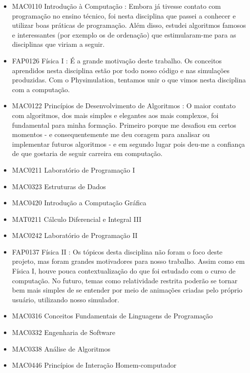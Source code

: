 \begin{itemize}

\item MAC0110   Introdução à Computação : Embora já tivesse contato com programação no ensino técnico, foi nesta disciplina que passei a conhecer e utilizar boas práticas de programação. Além disso, estudei algoritmos famosos e interessantes (por exemplo os de ordenação) que estimularam-me para as disciplinas que viriam a seguir.

\item FAP0126 	Física I : É a grande motivação deste trabalho. Os conceitos aprendidos nesta disciplina estão por todo nosso código e nas simulações produzidas. Com o Physimulation, tentamos unir o que vimos nesta disciplina com a computação.
 
\item MAC0122 	Princípios de Desenvolvimento de Algoritmos : O maior contato com algoritmos, dos mais simples e elegantes aos mais complexos, foi fundamental para minha formação. Primeiro porque me desafiou em certos momentos - e consequentemente me deu coragem para analisar ou implementar futuros algoritmos - e em segundo lugar pois deu-me a confiança de que gostaria de seguir carreira em computação.
 
\item MAC0211 	Laboratório de Programação I 
\item MAC0323 	Estruturas de Dados 
\item MAC0420 	Introdução a Computação Gráfica 
\item MAT0211 	Cálculo Diferencial e Integral III 
\item MAC0242 	Laboratório de Programação II 

\item FAP0137 	Física II : Os tópicos desta disciplina não foram o foco deste projeto, mas foram grandes motivadores para nosso trabalho. Assim como em Física I, houve pouca contextualização do que foi estudado com o curso de computação. No futuro, temas como relatividade restrita poderão se tornar bem mais simples de se entender por meio de animações criadas pelo próprio usuário, utilizando nosso simulador.
 
\item MAC0316 	Conceitos Fundamentais de Linguagens de Programação 	
\item MAC0332 	Engenharia de Software 
\item MAC0338 	Análise de Algoritmos
\item MAC0446 	Princípios de Interação Homem-computador 


\end{itemize}
